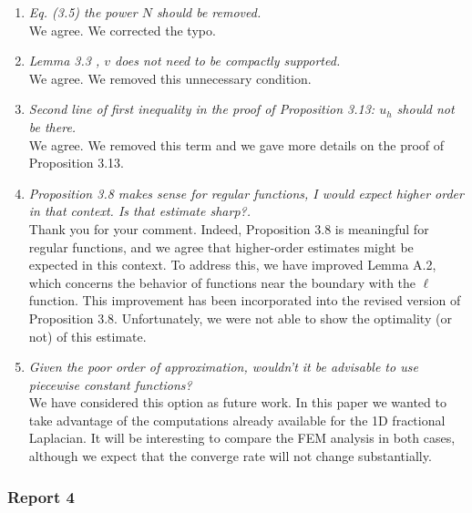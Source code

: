 \documentclass[11 pt]{article}
\numberwithin{equation}{section}
\begin{document}
\begin{enumerate}
\item \emph{Eq. (3.5) the power $N$ should be removed.}\\
We agree. We corrected the typo.
\item \emph{Lemma 3.3 , $v$ does not need to be compactly supported.}\\
We agree. We removed this unnecessary condition.
\item \emph{Second line of first inequality in the proof of Proposition 3.13: $u_h$ should not be there.}\\
We agree. We removed this term and we gave more details on the proof of Proposition 3.13.
\item \emph{Proposition 3.8 makes sense for regular functions, I would expect higher order in that context. Is that estimate sharp?.}\\
Thank you for your comment. Indeed, Proposition 3.8 is meaningful for regular functions, and we agree that higher-order estimates might be expected in this context. To address this, we have improved Lemma A.2, which concerns the behavior of functions near the boundary with the $\ell$ function. This improvement has been incorporated into the revised version of Proposition 3.8.  Unfortunately, we were not able to show the optimality (or not) of this estimate.
\item \emph{Given the poor order of approximation, wouldn't it be advisable to use piecewise constant functions?}\\
We have considered this option as future work.  In this paper we wanted to take advantage of the computations already available for the 1D fractional Laplacian. It will be interesting to compare the FEM analysis in both cases, although we expect that the converge rate will not change substantially.
\end{enumerate}


\newpage


\subsubsection*{Report 4}
\end{document}
